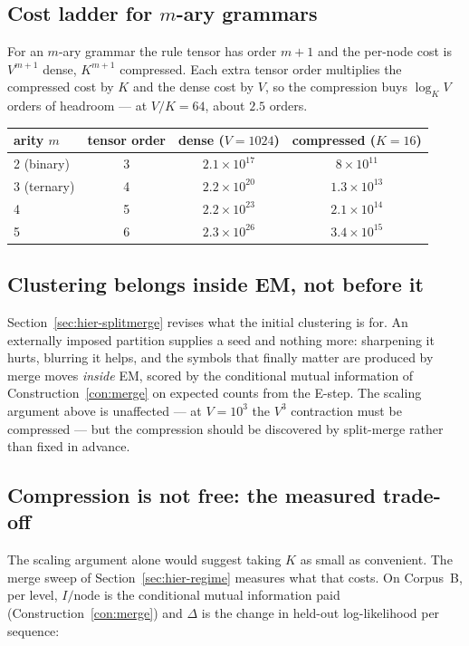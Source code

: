 \documentclass[11pt,a4paper]{article}
\theoremstyle{plain}
\theoremstyle{definition}
\begin{document}
\subsection{Cost ladder for $m$-ary grammars}

For an $m$-ary grammar the rule tensor has order $m+1$ and the per-node cost is
$V^{m+1}$ dense, $K^{m+1}$ compressed. Each extra tensor order multiplies the
compressed cost by $K$ and the dense cost by $V$, so the compression buys
$\log_K V$ orders of headroom --- at $V/K = 64$, about $2.5$ orders.

\begin{center}
\begin{tabular}{lccc}
\toprule
arity $m$ & tensor order & dense ($V=1024$) & compressed ($K=16$) \\
\midrule
2 (binary)  & 3 & $2.1\times10^{17}$ & $8\times10^{11}$ \\
3 (ternary) & 4 & $2.2\times10^{20}$ & $1.3\times10^{13}$ \\
4           & 5 & $2.2\times10^{23}$ & $2.1\times10^{14}$ \\
5           & 6 & $2.3\times10^{26}$ & $3.4\times10^{15}$ \\
\bottomrule
\end{tabular}
\end{center}

\subsection{Clustering belongs inside EM, not before it}

Section~\ref{sec:hier-splitmerge} revises what the initial clustering is for.
An externally imposed partition supplies a seed and nothing more: sharpening it
hurts, blurring it helps, and the symbols that finally matter are produced by
merge moves \emph{inside} EM, scored by the conditional mutual information of
Construction~\ref{con:merge} on expected counts from the E-step. The scaling
argument above is unaffected --- at $V=10^3$ the $V^3$ contraction must be
compressed --- but the compression should be discovered by split-merge rather
than fixed in advance.

\subsection{Compression is not free: the measured trade-off}

The scaling argument alone would suggest taking $K$ as small as convenient.
The merge sweep of Section~\ref{sec:hier-regime} measures what that costs. On
Corpus~B, per level, $I/\text{node}$ is the conditional mutual information paid
(Construction~\ref{con:merge}) and $\Delta$ is the change in held-out
log-likelihood per sequence:
\end{document}
